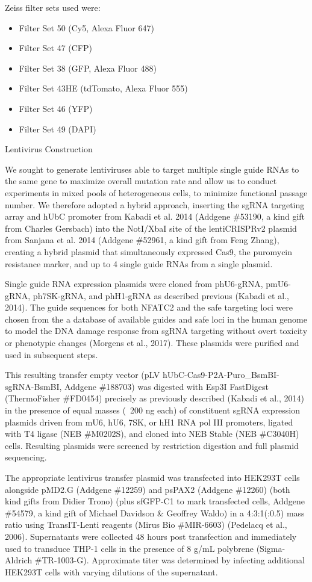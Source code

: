 Zeiss filter sets used were: 
\begin{itemize}
\item Filter Set 50 (Cy5, Alexa Fluor 647)
\item Filter Set 47 (CFP)
\item Filter Set 38 (GFP, Alexa Fluor 488)
\item Filter Set 43HE (tdTomato, Alexa Fluor 555)
\item Filter Set 46 (YFP)
\item Filter Set 49 (DAPI)
\end{itemize}

Lentivirus Construction

We sought to generate lentiviruses able to target multiple single guide RNAs to the same gene to maximize overall mutation rate and allow us to conduct experiments in mixed pools of heterogeneous cells, to minimize functional passage number. We therefore adopted a hybrid approach, inserting the sgRNA targeting array and hUbC promoter from Kabadi et al. 2014 (Addgene \#53190, a kind gift from Charles Gersbach) into the NotI/XbaI site of the lentiCRISPRv2 plasmid from Sanjana et al. 2014 (Addgene \#52961, a kind gift from Feng Zhang), creating a hybrid plasmid that simultaneously expressed Cas9, the puromycin resistance marker, and up to 4 single guide RNAs from a single plasmid.

Single guide RNA expression plasmids were cloned from phU6-gRNA, pmU6-gRNA, ph7SK-gRNA, and phH1-gRNA as described previous (Kabadi et al., 2014). The guide sequences for both NFATC2 and the safe targeting loci were chosen from the a database of available guides and safe loci in the human genome to model the DNA damage response from sgRNA targeting without overt toxicity or phenotypic changes (Morgens et al., 2017). These plasmids were purified and used in subsequent steps.

This resulting transfer empty vector (pLV hUbC-Cas9-P2A-Puro\_BsmBI-sgRNA-BsmBI, Addgene \#188703) was digested with Esp3I FastDigest (ThermoFisher \#FD0454) precisely as previously described (Kabadi et al., 2014) in the presence of equal masses (~200 ng each) of constituent sgRNA expression plasmids driven from mU6, hU6, 7SK, or hH1 RNA pol III promoters, ligated with T4 ligase (NEB \#M0202S), and cloned into NEB Stable (NEB \#C3040H) cells. Resulting plasmids were screened by restriction digestion and full plasmid sequencing. 

The appropriate lentivirus transfer plasmid was transfected into HEK293T cells alongside pMD2.G (Addgene \#12259) and psPAX2 (Addgene \#12260) (both kind gifts from Didier Trono) (plus sfGFP-C1 to mark transfected cells, Addgene \#54579, a kind gift of Michael Davidson \& Geoffrey Waldo) in a 4:3:1(:0.5) mass ratio using TransIT-Lenti reagents (Mirus Bio \#MIR-6603) (Pedelacq et al., 2006). Supernatants were collected 48 hours post transfection and immediately used to transduce THP-1 cells in the presence of 8 \textmu g/mL polybrene (Sigma-Aldrich \#TR-1003-G). Approximate titer was determined by infecting additional HEK293T cells with varying dilutions of the supernatant.

